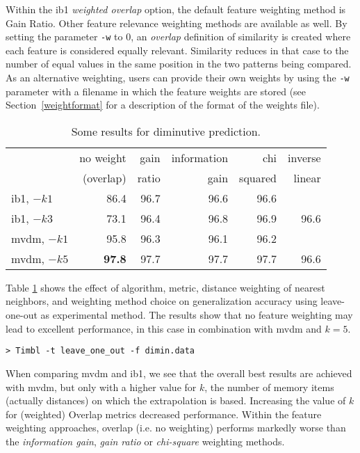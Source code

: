 \documentclass{report}
\begin{document}
Within the {\sc ib1} {\em weighted overlap} option, the default
feature weighting method is Gain Ratio. Other feature relevance
weighting methods are available as well.  By setting the parameter
{\tt -w} to 0, an {\em overlap} definition of similarity is created
where each feature is considered equally relevant. Similarity reduces
in that case to the number of equal values in the same position in the
two patterns being compared. As an alternative weighting, users can
provide their own weights by using the {\tt -w} parameter with a
filename in which the feature weights are stored (see
Section~\ref{weightformat} for a description of the format of the
weights file).

\begin{table}
\begin{center}
\begin{tabular}{l|rrrrr}
             & no weight & gain  & information & chi     & inverse \\
             & (overlap) & ratio & gain        & squared & linear\\
\noalign{\smallskip}
\hline
\noalign{\smallskip}
{\sc ib1},  $-k1$ & 86.4 & 96.7 & 96.6 & 96.6 &      \\
{\sc ib1},  $-k3$ & 73.1 & 96.4 & 96.8 & 96.9 & 96.6 \\
{\sc mvdm}, $-k1$ & 95.8 & 96.3 & 96.1 & 96.2 &      \\
{\sc mvdm}, $-k5$ & {\bf 97.8} & 97.7 & 97.7 & 97.7 & 96.6 \\

\end{tabular}
\caption{Some results for diminutive prediction.}
\label{diminresults}
\end{center}
\end{table}

Table \ref{diminresults} shows the effect of algorithm, metric,
distance weighting of nearest neighbors, and weighting method choice
on generalization accuracy using leave-one-out as experimental
method. The results show that no feature weighting may lead to
excellent performance, in this case in combination with {\sc mvdm} and
$k=5$.

{\footnotesize
\begin{verbatim}
> Timbl -t leave_one_out -f dimin.data
\end{verbatim}
}

When comparing {\sc mvdm} and {\sc ib1}, we see that the overall best
results are achieved with {\sc mvdm}, but only with a higher value for
$k$, the number of memory items (actually distances) on which the
extrapolation is based. Increasing the value of $k$ for (weighted)
Overlap metrics decreased performance. Within the feature weighting
approaches, overlap (i.e. no weighting) performs markedly worse than
the {\em information gain}, {\em gain ratio} or {\em
chi-square} weighting methods. 
\end{document}
